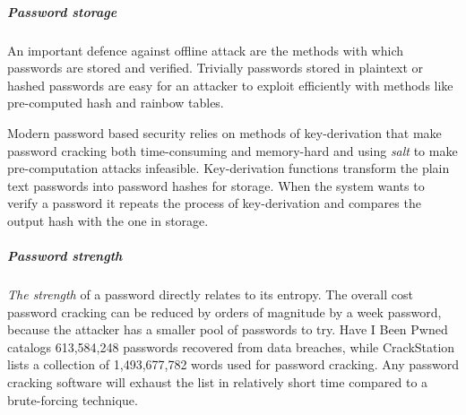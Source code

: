 \subparagraph{Password storage}
An important defence against offline attack are the methods with which passwords are stored and verified.
Trivially passwords stored in plaintext or hashed passwords are easy for an attacker to exploit efficiently with methods like pre-computed hash and rainbow tables. 

Modern password based security relies on methods of key-derivation that make password cracking both time-consuming and memory-hard \cite{percival2016scrypt, biryukov2016argon2, boneh2016balloon} and using \textit{salt} \cite{hornby2016salted} to make pre-computation attacks infeasible.
Key-derivation functions transform the plain text passwords into password hashes for storage.
When the system wants to verify a password it repeats the process of key-derivation and compares the output hash with the one in storage. %

\subparagraph{Password strength}
\textit{The strength} of a password directly relates to its entropy. The overall cost password cracking can be reduced by orders of magnitude by a week password, because the attacker has a smaller pool of passwords to try.
Have I Been Pwned \cite{hunt2021have} catalogs 613,584,248 passwords recovered from data breaches, while CrackStation \cite{hornby2019password} lists a collection of 1,493,677,782 words used for password cracking. Any password cracking software will exhaust the list in relatively short time compared to a brute-forcing technique.








